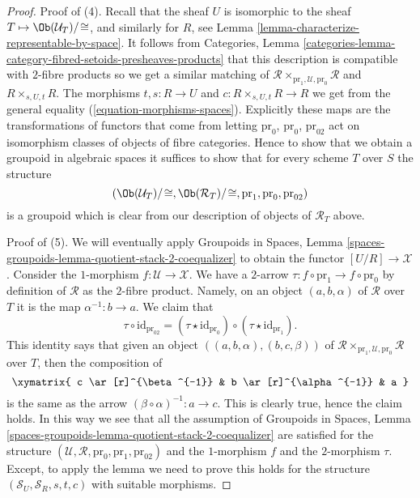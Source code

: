 \begin{proof}
\medskip\noindent
Proof of (4). Recall that the sheaf $U$ is isomorphic to the sheaf
$T \mapsto \Ob(\mathcal{U}_T)/\!\cong$, and
similarly for $R$, see
Lemma \ref{lemma-characterize-representable-by-space}.
It follows from
Categories,
Lemma \ref{categories-lemma-category-fibred-setoids-presheaves-products}
that this description is compatible with $2$-fibre products
so we get a similar matching of
$\mathcal{R} \times_{\text{pr}_1, \mathcal{U}, \text{pr}_0} \mathcal{R}$
and $R \times_{s, U, t} R$.
The morphisms $t, s : R \to U$ and $c : R \times_{s, U, t} R \to R$
we get from the general equality (\ref{equation-morphisms-spaces}).
Explicitly these maps are the transformations of functors that come
from letting $\text{pr}_0$, $\text{pr}_0$, $\text{pr}_{02}$
act on isomorphism classes of objects of fibre categories.
Hence to show that we obtain a groupoid in algebraic
spaces it suffices to show that for every scheme $T$ over $S$
the structure
$$
(\Ob(\mathcal{U}_T)/\!\cong,
\Ob(\mathcal{R}_T)/\!\cong,
\text{pr}_1, \text{pr}_0, \text{pr}_{02})
$$
is a groupoid which is clear from our description of objects of
$\mathcal{R}_T$ above.

\medskip\noindent
Proof of (5). We will eventually apply
Groupoids in Spaces,
Lemma \ref{spaces-groupoids-lemma-quotient-stack-2-coequalizer}
to obtain the functor $[U/R] \to \mathcal{X}$.
Consider the $1$-morphism $f : \mathcal{U} \to \mathcal{X}$.
We have a $2$-arrow $\tau : f \circ \text{pr}_1 \to f \circ \text{pr}_0$
by definition of $\mathcal{R}$ as the $2$-fibre product.
Namely, on an object $(a, b, \alpha)$ of $\mathcal{R}$ over $T$ it is
the map $\alpha^{-1} : b \to a$. We claim that
$$
\tau \circ \text{id}_{\text{pr}_{02}} =
(\tau \star \text{id}_{\text{pr}_0})
\circ
(\tau \star \text{id}_{\text{pr}_1}).
$$
This identity says that given an object
$((a, b, \alpha), (b, c, \beta))$ of
$\mathcal{R} \times_{\text{pr}_1, \mathcal{U}, \text{pr}_0} \mathcal{R}$
over $T$, then the composition of
$$
\xymatrix{
c \ar[r]^{\beta^{-1}} & b \ar[r]^{\alpha^{-1}} & a
}
$$
is the same as the arrow $(\beta \circ \alpha)^{-1} : a \to c$. This is
clearly true, hence the claim holds. In this way we see that all the
assumption of
Groupoids in Spaces,
Lemma \ref{spaces-groupoids-lemma-quotient-stack-2-coequalizer}
are satisfied for the structure
$(\mathcal{U}, \mathcal{R}, \text{pr}_0, \text{pr}_1, \text{pr}_{02})$
and the $1$-morphism $f$ and the $2$-morphism $\tau$.
Except, to apply the lemma we need to prove this holds
for the structure $(\mathcal{S}_U, \mathcal{S}_R, s, t, c)$
with suitable morphisms.


\end{proof}
